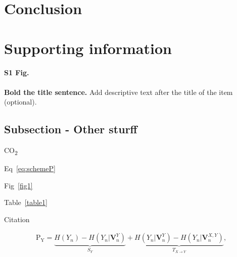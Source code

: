 \documentclass[10pt,letterpaper]{article}
\begin{document}
\section*{Conclusion}




\cite{Askew2020}






\pagebreak










\pagebreak
\section*{Supporting information}
\paragraph*{S1 Fig.}
\label{S1_Fig}
{\bf Bold the title sentence.} Add descriptive text after the title of the item (optional).



\subsection*{Subsection - Other sturff}



CO\textsubscript{2}


Eq~\ref{eq:schemeP}


Fig~\ref{fig1}


Table~\ref{table1} 


Citation~\cite{LaGennusa2005}




\begin{eqnarray}
\label{eq:schemeP}
	\mathrm{P_Y} = \underbrace{H(Y_n) - H(Y_n|\mathbf{V}^{Y}_{n})}_{S_Y} + \underbrace{H(Y_n|\mathbf{V}^{Y}_{n})- H(Y_n|\mathbf{V}^{X,Y}_{n})}_{T_{X\rightarrow Y}},
\end{eqnarray}
\end{document}
